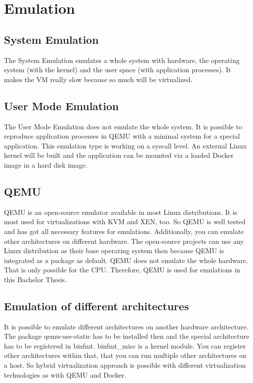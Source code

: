 \chapter{Emulation}\label{ch:emulation}

\section{System Emulation}

The System Emulation emulates a whole system with hardware, the operating system (with the kernel) and the user space (with application processes). It makes the VM really slow because so much will be virtualized.

\section{User Mode Emulation}

The User Mode Emulation does not emulate the whole system. It is possible to reproduce application processes in QEMU with a minimal system for a special application. This emulation type is working on a syscall level. An external Linux kernel will be built and the application can be mounted via a loaded Docker image in a hard disk image. 

\section{QEMU}

QEMU is an open-source emulator available in most Linux distributions. It is most used for virtualizations with KVM and XEN, too. So QEMU is well tested and has got all necessary features for emulations. Additionally, you can emulate other architectures on different hardware. The open-source projects can use any Linux distribution as their base operating system then because QEMU is integrated as a package as default. QEMU does not emulate the whole hardware. That is only possible for the CPU. Therefore, QEMU is used for emulations in this Bachelor Thesis.

\section{Emulation of different architectures}

It is possible to emulate different architectures on another hardware architecture. The package qemu-use-static has to be installed then and the special architecture has to be registered in binfmt. binfmt\_misc is a kernel module. You can register other architectures within that, that you can run multiple other architectures on a host. So hybrid virtualization approach is possible with different virtualization technologies as with QEMU and Docker.


